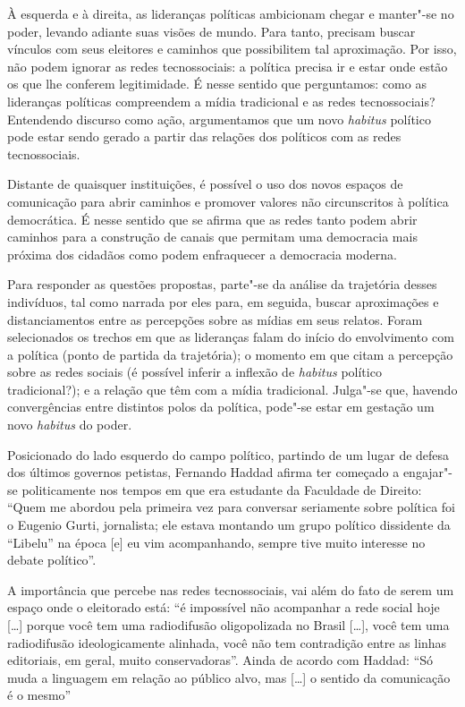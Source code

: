 À esquerda e à direita, as lideranças políticas ambicionam chegar e
manter"-se no poder, levando adiante suas visões de mundo. Para tanto,
precisam buscar vínculos com seus eleitores e caminhos que possibilitem
tal aproximação. Por isso, não podem ignorar as redes tecnossociais: a
política precisa ir e estar onde estão os que lhe conferem legitimidade.
É nesse sentido que perguntamos: como as lideranças políticas
compreendem a mídia tradicional e as redes tecnossociais? Entendendo
discurso como ação, argumentamos que um novo \emph{habitus} político
pode estar sendo gerado a partir das relações dos políticos com as redes
tecnossociais.

Distante de quaisquer instituições, é possível o uso dos novos espaços
de comunicação para abrir caminhos e promover valores não circunscritos
à política democrática. É nesse sentido que se afirma que as redes tanto
podem abrir caminhos para a construção de canais que permitam uma
democracia mais próxima dos cidadãos como podem enfraquecer a democracia
moderna.

Para responder as questões propostas, parte"-se da análise da trajetória
desses indivíduos, tal como narrada por eles para, em seguida, buscar
aproximações e distanciamentos entre as percepções sobre as mídias em
seus relatos. Foram selecionados os trechos em que as lideranças falam
do início do envolvimento com a política (ponto de partida da
trajetória); o momento em que citam a percepção sobre as redes sociais
(é possível inferir a inflexão de \emph{habitus} político tradicional?);
e a relação que têm com a mídia tradicional. Julga"-se que, havendo
convergências entre distintos polos da política, pode"-se estar em
gestação um novo \emph{habitus} do poder.

Posicionado do lado esquerdo do campo político, partindo de um lugar de
defesa dos últimos governos petistas, Fernando Haddad afirma ter
começado a engajar"-se politicamente nos tempos em que era estudante da
Faculdade de Direito: ``Quem me abordou pela primeira vez para conversar
seriamente sobre política foi o Eugenio Gurti, jornalista; ele estava
montando um grupo político dissidente da ``Libelu'' na época {[}e{]} eu
vim acompanhando, sempre tive muito interesse no debate político''.

A importância que percebe nas redes tecnossociais, vai além do fato de
serem um espaço onde o eleitorado está: ``é impossível não acompanhar a
rede social hoje {[}\ldots{}{]} porque você tem uma radiodifusão
oligopolizada no Brasil {[}\ldots{}{]}, você tem uma radiodifusão
ideologicamente alinhada, você não tem contradição entre as linhas
editoriais, em geral, muito conservadoras''. Ainda de acordo com Haddad:
``Só muda a linguagem em relação ao público alvo, mas {[}\ldots{}{]} o
sentido da comunicação é o mesmo''

